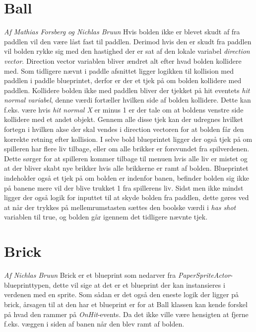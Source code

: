 \section{Ball}
\textit{Af Mathias Forsberg og Nichlas Bruun}\newline
Hvis bolden ikke er blevet skudt af fra paddlen vil den være låst fast til paddlen. Derimod hvis den er skudt fra paddlen vil bolden rykke sig med den hastighed der er sat af den lokale variabel \textit{direction vector}. Direction vector variablen bliver ændret alt efter hvad bolden kollidere med. Som tidligere nævnt i paddle afsnittet ligger logikken til kollision med paddlen i paddle blueprintet, derfor er der et tjek på om bolden kollidere med paddlen. Kollidere bolden ikke med paddlen bliver der tjekket på hit eventets \textit{hit normal variabel}, denne værdi fortæller hvilken side af bolden kollidere. Dette kan f.eks. være hvis \textit{hit normal X} er minus 1 er der tale om at boldens venstre side kollidere med et andet objekt. Gennem alle disse tjek kan der udregnes hvilket fortegn i hvilken akse der skal vendes i direction vectoren for at bolden får den korrekte retning efter kollision. I selve bold blueprintet ligger der også tjek på om spilleren har flere liv tilbage, eller om alle brikker er forsvundet fra spilverdenen. Dette sørger for at spilleren kommer tilbage til menuen hvis alle liv er mistet og at der bliver skabt nye brikker hvis alle brikkerne er ramt af bolden. Blueprintet indeholder også et tjek på om bolden er indenfor banen, befinder bolden sig ikke på banene mere vil der blive trukket 1 fra spillerens liv. Sidst men ikke mindst ligger der også logik for inputtet til at skyde bolden fra paddlen, dette gøres ved at når der trykkes på mellemrumstasten sættes den boolske værdi i \textit{has shot} variablen til true, og bolden går igennem det tidligere nævnte tjek.  

\section{Brick}
\textit{Af Nichlas Bruun}\newline
Brick er et blueprint som nedarver fra \textit{PaperSpriteActor}-blueprinttypen, dette vil sige at det er et blueprint der kan instansieres i verdenen med en sprite. Som sådan er det også den eneste logik der ligger på brick, årsagen til at den har et blueprint er for at Ball klassen kan kende forskel på hvad den rammer på \textit{OnHit}-events. Da det ikke ville være hensigten at fjerne f.eks. væggen i siden af banen når den blev ramt af bolden.

